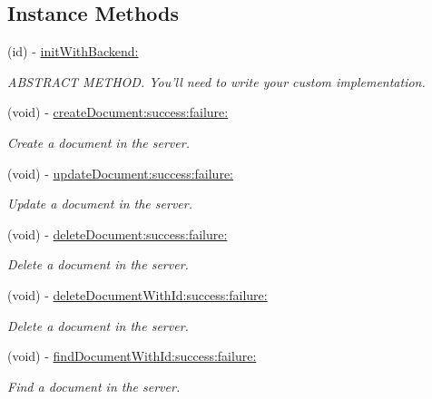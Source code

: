 \subsection*{Instance Methods}
\begin{DoxyCompactItemize}
\item 
(id) -\/ \hyperlink{interface_i_j_abstract_repository_aaf55a25070c26c7c4a196fd351d26120}{init\+With\+Backend\+:}
\begin{DoxyCompactList}\small\item\em A\+B\+S\+T\+R\+A\+C\+T M\+E\+T\+H\+O\+D. You'll need to write your custom implementation. \end{DoxyCompactList}\item 
(void) -\/ \hyperlink{interface_i_j_abstract_repository_afc684685531c52dc0416f3102e36b863}{create\+Document\+:success\+:failure\+:}
\begin{DoxyCompactList}\small\item\em Create a document in the server. \end{DoxyCompactList}\item 
(void) -\/ \hyperlink{interface_i_j_abstract_repository_a2f12e0f9ef13c70b111a0a62380e5057}{update\+Document\+:success\+:failure\+:}
\begin{DoxyCompactList}\small\item\em Update a document in the server. \end{DoxyCompactList}\item 
(void) -\/ \hyperlink{interface_i_j_abstract_repository_a4775f90e1f9bea0059570e333d63f627}{delete\+Document\+:success\+:failure\+:}
\begin{DoxyCompactList}\small\item\em Delete a document in the server. \end{DoxyCompactList}\item 
(void) -\/ \hyperlink{interface_i_j_abstract_repository_abe7d6b453fb5a147da1a5aff76aac81c}{delete\+Document\+With\+Id\+:success\+:failure\+:}
\begin{DoxyCompactList}\small\item\em Delete a document in the server. \end{DoxyCompactList}\item 
(void) -\/ \hyperlink{interface_i_j_abstract_repository_a66ba7a11b374ddb499bb7da97cd27151}{find\+Document\+With\+Id\+:success\+:failure\+:}
\begin{DoxyCompactList}\small\item\em Find a document in the server. \end{DoxyCompactList}\item 

\end{DoxyCompactItemize}
